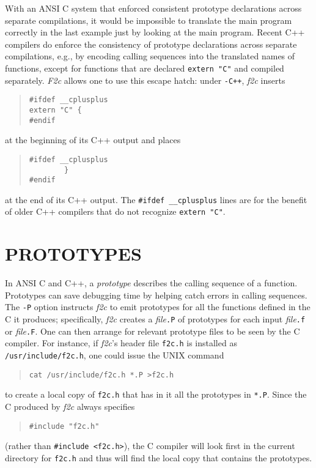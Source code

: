\documentclass[10pt,a4paper]{article}
\begin{document}
With an ANSI C system that enforced consistent prototype declarations across separate compilations, it would be impossible to translate the main program correctly in the last example just by looking at the main program. Recent C++ compilers do enforce the consistency of prototype declarations across separate compilations, e.g., by encoding calling sequences into the translated names of functions, except for functions that are declared \verb|extern "C"| and compiled separately. \emph{F2c} allows one to use this escape hatch: under \verb|-C++|, \emph{f2c} inserts
\begin{quote}
\begin{verbatim}
#ifdef __cplusplus
extern "C" {
#endif
\end{verbatim}
\end{quote}
at the beginning of its C++ output and places
\begin{quote}
\begin{verbatim}
#ifdef __cplusplus
        }
#endif
\end{verbatim}
\end{quote}
at the end of its C++ output. The \verb|#ifdef __cplusplus| lines are for the benefit of older C++ compilers that do not recognize \verb|extern "C"|.

\section{PROTOTYPES} \label{sec:prototypes}

In ANSI C and C++, a \emph{prototype} describes the calling sequence of a function. Prototypes can save debugging time by helping catch errors in calling sequences. The \verb|-P| option instructs \emph{f2c} to emit prototypes for all the functions defined in the C it produces; specifically, \emph{f2c} creates a \emph{file}\verb|.P| of prototypes for each input \emph{file}\verb|.f| or \emph{file}\verb|.F|. One can then arrange for relevant prototype files to be seen by the C compiler. For instance, if \emph{f2c}’s header file \verb|f2c.h| is installed as \verb|/usr/include/f2c.h|, one could issue the UNIX command
\begin{quote}
\begin{verbatim}
cat /usr/include/f2c.h *.P >f2c.h
\end{verbatim}
\end{quote}
to create a local copy of \verb|f2c.h| that has in it all the prototypes in \verb|*.P|. Since the C produced by \emph{f2c} always specifies
\begin{quote}
\begin{verbatim}
#include "f2c.h"
\end{verbatim}
\end{quote}
(rather than \verb|#include <f2c.h>|), the C compiler will look first in the current directory for \verb|f2c.h| and thus will find the local copy that contains the prototypes.
\end{document}
